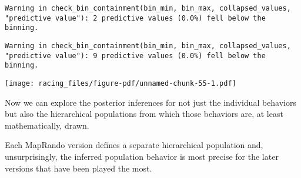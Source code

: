 \documentclass[
  letterpaper,
  DIV=11,
  numbers=noendperiod]{scrartcl}
\begin{document}
\begin{verbatim}
Warning in check_bin_containment(bin_min, bin_max, collapsed_values,
"predictive value"): 2 predictive values (0.0%) fell below the binning.
\end{verbatim}

\begin{verbatim}
Warning in check_bin_containment(bin_min, bin_max, collapsed_values,
"predictive value"): 9 predictive values (0.0%) fell below the binning.
\end{verbatim}

\texttt{[image: racing\_files/figure-pdf/unnamed-chunk-55-1.pdf]}

Now we can explore the posterior inferences for not just the individual
behaviors but also the hierarchical populations from which those
behaviors are, at least mathematically, drawn.

Each MapRando version defines a separate hierarchical population and,
unsurprisingly, the inferred population behavior is most precise for the
later versions that have been played the most.
\end{document}
